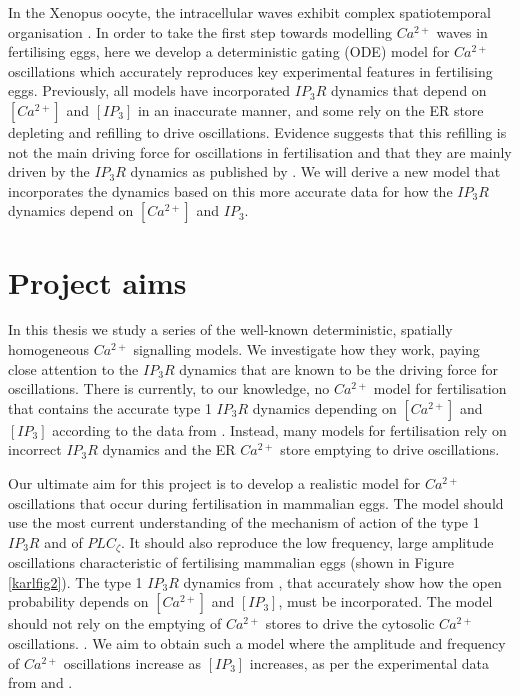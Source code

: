 {In the Xenopus oocyte, the intracellular waves exhibit complex spatiotemporal organisation . In order to take the first step towards modelling $Ca^{2+}$ waves in fertilising eggs, here we develop a deterministic gating (ODE) model for $Ca^{2+}$ oscillations which accurately reproduces key experimental features in fertilising eggs. {Previously, all models have incorporated $IP_3R$ dynamics that depend on $[Ca^{2+}]$ and $[IP_3]$ in an inaccurate manner, and some rely on the ER store depleting and refilling to drive oscillations. Evidence  suggests that this refilling is not the main driving force for oscillations in fertilisation and that they are mainly driven by the $IP_3R$ dynamics as published by . We will derive a new model that incorporates the dynamics based on this more accurate data for how the $IP_3R$ dynamics depend on $[Ca^{2+}]$ and $IP_3$.}

\section{Project aims}

In this thesis we study a series of the well-known deterministic, spatially homogeneous $Ca^{2+}$ signalling models. We investigate how they work, paying close attention to the $IP_3R$ dynamics that are known to be the driving force for oscillations. There is currently, to our knowledge, no $Ca^{2+}$ model for fertilisation that contains the {accurate} type 1 $IP_3R$ dynamics {depending on $[Ca^{2+}]$ and $[IP_3]$} {according to the data} from . Instead, many models for fertilisation rely on incorrect $IP_3R$ dynamics and the ER $Ca^{2+}$ store emptying to drive oscillations.

Our ultimate aim for this project is to develop a realistic model for $Ca^{2+}$ oscillations that occur during fertilisation in mammalian eggs. The model should use the most current understanding of the mechanism of action of the type 1 $IP_3R$ and of $PLC_{\zeta}$. It should also reproduce the low frequency, large amplitude oscillations characteristic of fertilising mammalian eggs (shown in Figure \ref{karlfig2}). The type 1 $IP_3R$ dynamics from , {that accurately show how the open probability depends on $[Ca^{2+}]$ and $[IP_3]$}, must be incorporated. The model should not rely on the emptying of $Ca^{2+}$ stores {to drive the cytosolic $Ca^{2+}$ oscillations. }\cite{Sanders2018}. We aim to obtain such a model where the amplitude and frequency of $Ca^{2+}$ oscillations increase as $[IP_3]$ increases, as per the experimental data from  and .

}
